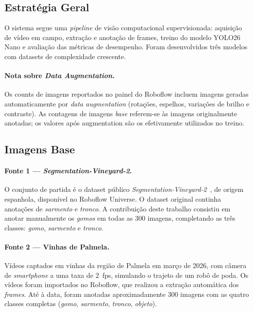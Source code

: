 \documentclass[12pt, a4paper]{article}
\begin{document}
\subsection{Estratégia Geral}

O sistema segue uma \textit{pipeline} de visão computacional supervisionada:
aquisição de vídeo em campo, extração e anotação de frames, treino do
modelo YOLO26 Nano e avaliação das métricas de desempenho. Foram
desenvolvidos três modelos com datasets de complexidade crescente.

\paragraph{Nota sobre \textit{Data Augmentation}.}
Os counts de imagens reportados no painel do Roboflow incluem imagens
geradas automaticamente por \textit{data augmentation} (rotações, espelhos,
variações de brilho e contraste). As contagens de imagens \textit{base}
referem-se às imagens originalmente anotadas; os valores após augmentation
são os efetivamente utilizados no treino.

\subsection{Imagens Base}

\paragraph{Fonte 1 — \textit{Segmentation-Vineyard-2}.}
O conjunto de partida é o dataset público
\textit{Segmentation-Vineyard-2}~\cite{vinya2024segvineyard}, de origem
espanhola, disponível no Roboflow Universe. O dataset original continha
anotações de \textit{sarmento} e \textit{tronco}. A contribuição deste
trabalho consistiu em anotar manualmente os \textit{gomos} em todas as
300 imagens, completando as três classes: \textit{gomo}, \textit{sarmento}
e \textit{tronco}.

\paragraph{Fonte 2 — Vinhas de Palmela.}
Vídeos captados em vinhas da região de Palmela em março de 2026, com
câmera de \textit{smartphone} a uma taxa de 2~fps, simulando o trajeto de
um robô de poda. Os vídeos foram importados no Roboflow, que realizou a
extração automática dos \textit{frames}. Até à data, foram anotadas
aproximadamente 300 imagens com as quatro classes completas
(\textit{gomo}, \textit{sarmento}, \textit{tronco}, \textit{objeto}).
\end{document}
